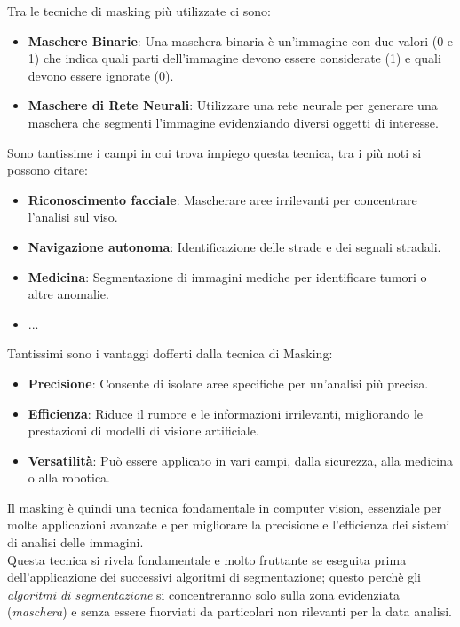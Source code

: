 \documentclass[12pt,a4paper,openright,twoside]{book}
\begin{document}
Tra le tecniche di masking più utilizzate ci sono:
\begin{itemize}
\item \textbf{Maschere Binarie}:
Una maschera binaria è un'immagine con due valori (0 e 1) che indica quali parti dell'immagine devono essere considerate (1) e quali devono essere ignorate (0).
\item \textbf{Maschere di Rete Neurali}:
Utilizzare una rete neurale per generare una maschera che segmenti l'immagine evidenziando diversi oggetti di interesse.
\end{itemize}

Sono tantissime i campi in cui trova impiego questa tecnica, tra i più noti si possono citare:
\begin{itemize}
\item \textbf{Riconoscimento facciale}: Mascherare aree irrilevanti per concentrare l'analisi sul viso.
\item \textbf{Navigazione autonoma}: Identificazione delle strade e dei segnali stradali.
\item \textbf{Medicina}: Segmentazione di immagini mediche per identificare tumori o altre anomalie.
\item ...
\end{itemize}
Tantissimi sono i vantaggi dofferti dalla tecnica di Masking:
\begin{itemize}
\item \textbf{Precisione}: Consente di isolare aree specifiche per un'analisi più precisa.
\item \textbf{Efficienza}: Riduce il rumore e le informazioni irrilevanti, migliorando le prestazioni di modelli di visione artificiale.
\item \textbf{Versatilità}: Può essere applicato in vari campi, dalla sicurezza, alla medicina o alla robotica.
\end{itemize}
Il masking è quindi una tecnica fondamentale in computer vision, essenziale per molte applicazioni avanzate e per migliorare la precisione e l'efficienza dei sistemi di analisi delle immagini.\\
Questa tecnica si rivela fondamentale e molto fruttante se eseguita prima dell'applicazione dei successivi algoritmi di segmentazione; questo perchè gli {\itshape algoritmi di segmentazione} si concentreranno solo sulla zona evidenziata ({\itshape maschera}) e senza essere fuorviati da particolari non rilevanti per la data analisi. 



\end{document}
